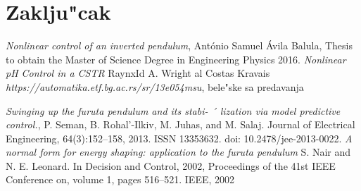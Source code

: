 \documentclass[a4paper,11pt]{article}
\theoremstyle{definition} \newtheorem{deff}{Definicija}[section]
\theoremstyle{definition} \newtheorem{prim}[deff]{Primer}
\theoremstyle{plain} \newtheorem{teor}[deff]{Teorema}
\begin{document}
	
	\section{Zaklju"cak}
	
	
	\newpage
	
	\begin{thebibliography}{9}
		\emph{Nonlinear control of an inverted pendulum}, António Samuel Ávila Balula, Thesis to obtain the Master of Science Degree in
		Engineering Physics 2016.
		\bibitem{}\emph{Nonlinear pH Control in a CSTR
		} RaynxId A. Wright al Costas Kravais
		\emph{https://automatika.etf.bg.ac.rs/sr/13e054msu}, bele"ske sa predavanja
		
		
		
		\emph{Swinging up the furuta pendulum and its stabi- ´
			lization via model predictive control.}, P. Seman, B. Rohal’-Ilkiv, M. Juhas, and M. Salaj.  Journal of Electrical Engineering, 64(3):152–158, 2013. ISSN
		13353632. doi: 10.2478/jee-2013-0022.
		\emph{A normal form for energy shaping: application to the furuta pendulum}
		S. Nair and N. E. Leonard. 
		In Decision and Control, 2002, Proceedings of the 41st IEEE Conference on, volume 1, pages
		516–521. IEEE, 2002
		
	\end{thebibliography}
\end{document}
